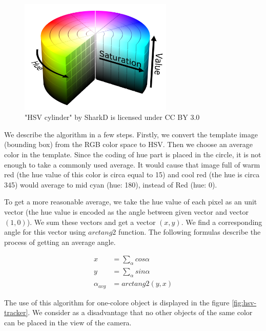\begin{figure}[h!]\centering
\includegraphics[width=0.65\textwidth]{img/hsv-cylinder.png}
\caption[Blah]{"HSV cylinder" by SharkD is licensed under CC BY 3.0 \footnotemark}
\end{figure}

We describe the algorithm in a few steps. Firstly, we convert the template
image (bounding box) from the RGB color space to HSV. Then we choose an average
color in the template. Since the coding of hue part is placed in the circle, it
is not enough to take a commonly used average. It would cause that image full
of warm red (the hue value of this color is circa equal to 15) and cool red
(the hue is circa 345) would average to mid cyan (hue: 180), instead of Red
(hue: 0).

To get a more reasonable average, we take the hue value of each pixel as an
unit vector (the hue value is encoded as the angle between given vector
and vector $(1, 0)$). We sum these vectors and get a vector $(x, y)$. We find a
corresponding angle for this vector using $arctang2$ function. The following
formulas describe the process of getting an average angle.


$$
\begin{aligned}
x &= \sum_\alpha cos \alpha \\
y &= \sum_\alpha sin \alpha \\
\alpha_{avg} &= arctang2(y, x)
\end{aligned}
$$

The use of this algorithm for one-colore object is displayed in the figure
\ref{fig:hsv-tracker}. We consider as a disadvantage that no other objects of
the same color can be placed in the view of the camera.

